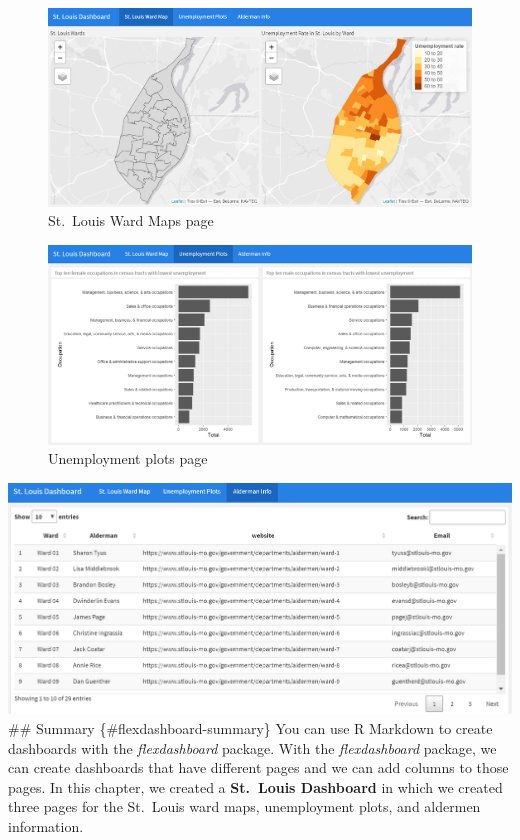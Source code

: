 \documentclass[
  krantz2]{krantz}
\begin{document}
\begin{figure}
\centering
\includegraphics{images/stl_dashboard5.png}
\caption{St.~Louis Ward Maps page}
\end{figure}

\begin{figure}
\centering
\includegraphics{images/stl_dashboard6.png}
\caption{Unemployment plots page}
\end{figure}

\includegraphics{images/stl_dashboard7.png}
\#\# Summary \{\#flexdashboard-summary\}
You can use R Markdown to create dashboards with the \emph{flexdashboard} package. With the \emph{flexdashboard} package, we can create dashboards that have different pages and we can add columns to those pages. In this chapter, we created a \textbf{St.~Louis Dashboard} in which we created three pages for the St.~Louis ward maps, unemployment plots, and aldermen information.
\end{document}
